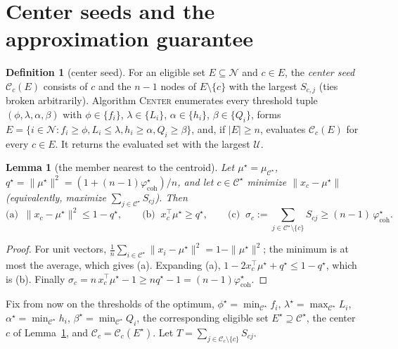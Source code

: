 \documentclass[10pt]{article}
\newtheorem{lemma}{Lemma}
\theoremstyle{remark}
\theoremstyle{definition}
\newtheorem{definition}{Definition}
\newcommand{\coh}{\varphi_{\text{coh}}}
\newcommand{\C}{\mathcal{C}}
\newcommand{\N}{\mathcal{N}}
\begin{document}
\section{Center seeds and the approximation guarantee}

\begin{definition}[center seed]
For an eligible set $E \subseteq \N$ and $c \in E$, the \emph{center seed} $\C_c(E)$ consists of $c$ and the $n-1$
nodes of $E \setminus \{c\}$ with the largest $S_{c,j}$ (ties broken arbitrarily). Algorithm \textsc{Center}
enumerates every threshold tuple $(\phi, \lambda, \alpha, \beta)$ with $\phi \in \{f_i\}$, $\lambda \in \{L_i\}$,
$\alpha \in \{h_i\}$, $\beta \in \{Q_i\}$, forms $E = \{i \in \N : f_i \ge \phi, L_i \le \lambda, h_i \ge \alpha,
Q_i \ge \beta\}$, and, if $|E| \ge n$, evaluates $\C_c(E)$ for every $c \in E$. It returns the evaluated set with
the largest $\mathcal{U}$.
\end{definition}

\begin{lemma}[the member nearest to the centroid]\label{lem:centroid}
Let $\mu^\star = \mu_{\C^\star}$, $q^\star = \|\mu^\star\|^2 = (1 + (n-1)\coh^\star)/n$, and let $c \in \C^\star$
minimize $\|x_c - \mu^\star\|$ (equivalently, maximize $\sum_{j \in \C^\star} S_{cj}$). Then
\[
\text{(a)}\;\; \|x_c - \mu^\star\|^2 \le 1 - q^\star, \qquad
\text{(b)}\;\; x_c^\top \mu^\star \ge q^\star, \qquad
\text{(c)}\;\; \sigma_c := \sum_{j \in \C^\star \setminus \{c\}} S_{cj} \ge (n-1)\,\coh^\star .
\]
\end{lemma}
\begin{proof}
For unit vectors, $\frac{1}{n}\sum_{i \in \C^\star} \|x_i - \mu^\star\|^2 = 1 - \|\mu^\star\|^2$; the minimum is at
most the average, which gives (a). Expanding (a), $1 - 2x_c^\top\mu^\star + q^\star \le 1 - q^\star$, which is (b).
Finally $\sigma_c = n\, x_c^\top \mu^\star - 1 \ge n q^\star - 1 = (n-1)\coh^\star$.
\end{proof}

Fix from now on the thresholds of the optimum, $\phi^\star = \min_{\C^\star} f_i$, $\lambda^\star = \max_{\C^\star}
L_i$, $\alpha^\star = \min_{\C^\star} h_i$, $\beta^\star = \min_{\C^\star} Q_i$, the corresponding eligible set
$E^\star \supseteq \C^\star$, the center $c$ of Lemma~\ref{lem:centroid}, and $\C_c = \C_c(E^\star)$. Let $T =
\sum_{j \in \C_c \setminus \{c\}} S_{cj}$.
\end{document}
